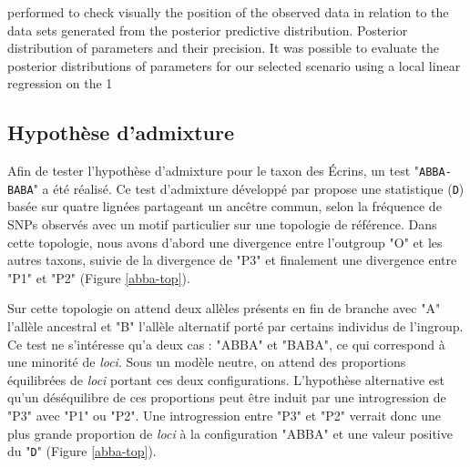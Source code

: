 performed to check visually the position of the observed data in relation to the data sets generated from the posterior predictive distribution. Posterior distribution of parameters and their precision. It was possible to evaluate the posterior distributions of parameters for our selected scenario using a local linear regression on the 1%

\subsection{Hypothèse d'admixture}

Afin de tester l'hypothèse d'admixture pour le taxon des Écrins, un test "\verb|ABBA-BABA|" a été réalisé. Ce test d'admixture développé par \citet{Durand2011} propose une statistique (\verb|D|) basée sur quatre lignées partageant un ancêtre commun, selon la fréquence de SNPs observés avec un motif particulier sur une topologie de référence. 
Dans cette topologie, nous avons d'abord une divergence entre l'outgroup "O" et les autres taxons, suivie de la divergence de "P3" et finalement une divergence entre "P1" et "P2" (Figure \ref{abba-top}). 

Sur cette topologie on attend deux allèles présents en fin de branche avec "A" l'allèle ancestral et "B" l'allèle alternatif porté par certains individus de l'ingroup.
 Ce test ne s'intéresse qu'a deux cas : "ABBA" et "BABA", ce qui correspond à une minorité de \textit{loci}. Sous un modèle neutre, on attend des proportions équilibrées de \textit{loci} portant ces deux configurations. L'hypothèse alternative est qu'un déséquilibre de ces proportions peut être induit par une introgression de "P3" avec "P1" ou "P2". Une introgression entre "P3" et "P2" verrait donc une plus grande proportion de \textit{loci} à la configuration "ABBA" et une valeur positive du "\verb|D|" (Figure \ref{abba-top}).

